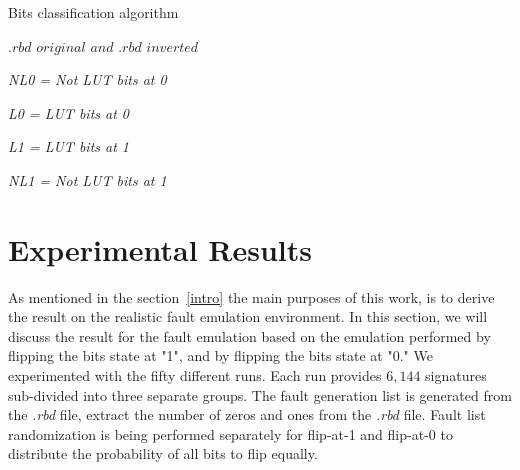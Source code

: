 \begin{algorithm}
\caption{Bits classification algorithm}
\begin{algorithmic}
\label{BCA}
\REQUIRE $.rbd$ $original$ $and$ $.rbd$ $inverted$ \\
\vspace{0.20 cm }

\vspace{0.10 cm }

\STATE \textit{ NL0 = Not LUT bits at 0}
\vspace{0.10 cm }

\vspace{0.10 cm }

\STATE \textit{ L0 = LUT bits at 0}
\vspace{0.10 cm }

\vspace{0.10 cm }

\STATE \textit{ L1 =  LUT bits at 1}
\vspace{0.10 cm }

\vspace{0.10 cm }

\STATE \textit{ NL1 = Not LUT bits at 1}
\vspace{0.10 cm }




\ENDIF
\vspace{0.20 cm }

\end{algorithmic}
\end{algorithm}






\section{Experimental Results}
\label{Experimental Results}


As mentioned in the section~\ref{intro} the main purposes of this work, is to derive the result on the realistic fault emulation environment. In this section, we will discuss the result for the fault emulation based on the emulation performed by flipping the bits state at "1", and by flipping the bits state at "0." We experimented with the fifty different runs. Each run provides $6,144$ signatures sub-divided into three separate groups.  The fault generation list is generated from the \textit{.rbd} file, extract the number of zeros and ones from the \textit{.rbd} file. Fault list randomization is being performed separately for flip-at-1 and flip-at-0 to distribute the probability of all bits to flip equally. 

